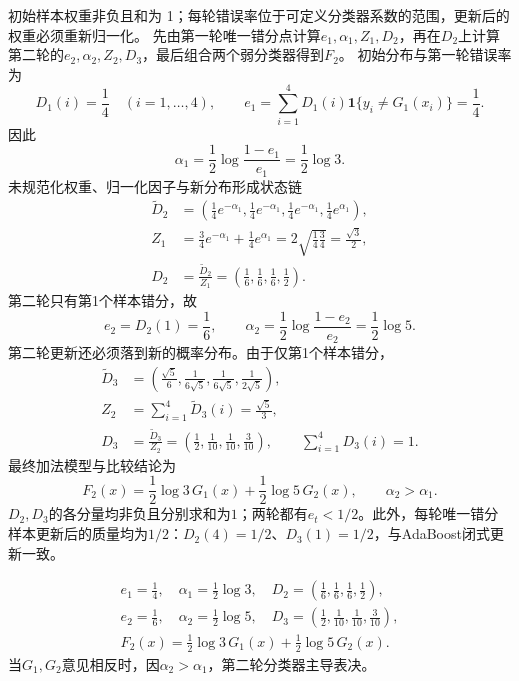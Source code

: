 \begin{solution}
\SolGiven 初始样本权重非负且和为 1；每轮错误率位于可定义分类器系数的范围，更新后的权重必须重新归一化。
\SolPlan 先由第一轮唯一错分点计算$e_1,\alpha_1,Z_1,D_2$，再在$D_2$上计算第二轮的$e_2,\alpha_2,Z_2,D_3$，最后组合两个弱分类器得到$F_2$。
\SolDerive
初始分布与第一轮错误率为
\[
D_1(i)=\frac14\quad(i=1,\ldots,4),
\qquad
e_1=\sum_{i=1}^{4}D_1(i)\mathbf1\{y_i\neq G_1(x_i)\}=\frac14.
\]
因此
\[
\alpha_1
=\frac12\log\frac{1-e_1}{e_1}
=\frac12\log3.
\]
未规范化权重、归一化因子与新分布形成状态链
\[
\begin{aligned}
\widetilde D_2
&=\left(\frac14e^{-\alpha_1},\frac14e^{-\alpha_1},
\frac14e^{-\alpha_1},\frac14e^{\alpha_1}\right),\\
Z_1
&=\frac34e^{-\alpha_1}+\frac14e^{\alpha_1}
=2\sqrt{\frac14\frac34}=\frac{\sqrt3}{2},\\
D_2&=\frac{\widetilde D_2}{Z_1}
=\left(\frac16,\frac16,\frac16,\frac12\right).
\end{aligned}
\]
第二轮只有第1个样本错分，故
\[
e_2=D_2(1)=\frac16,
\qquad
\alpha_2=\frac12\log\frac{1-e_2}{e_2}
=\frac12\log5.
\]
第二轮更新还必须落到新的概率分布。由于仅第1个样本错分，
\[
\begin{aligned}
\widetilde D_3
&=\left(\frac{\sqrt5}{6},
\frac{1}{6\sqrt5},
\frac{1}{6\sqrt5},
\frac{1}{2\sqrt5}\right),\\
Z_2&=\sum_{i=1}^{4}\widetilde D_3(i)
=\frac{\sqrt5}{3},\\
D_3&=\frac{\widetilde D_3}{Z_2}
=\left(\frac12,\frac1{10},\frac1{10},\frac3{10}\right),
\qquad \sum_{i=1}^{4}D_3(i)=1.
\end{aligned}
\]
最终加法模型与比较结论为
\[
F_2(x)=\frac12\log3\,G_1(x)+\frac12\log5\,G_2(x),
\qquad
\alpha_2>\alpha_1.
\]
\SolCheck $D_2,D_3$的各分量均非负且分别求和为$1$；两轮都有$e_t<1/2$。此外，每轮唯一错分样本更新后的质量均为$1/2$：$D_2(4)=1/2$、$D_3(1)=1/2$，与AdaBoost闭式更新一致。

\SolAnswer
\[
\begin{gathered}
e_1=\frac14,\quad \alpha_1=\frac12\log3,\quad
D_2=\left(\frac16,\frac16,\frac16,\frac12\right),\\
e_2=\frac16,\quad \alpha_2=\frac12\log5,\quad
D_3=\left(\frac12,\frac1{10},\frac1{10},\frac3{10}\right),\\
F_2(x)=\frac12\log3\,G_1(x)+\frac12\log5\,G_2(x).
\end{gathered}
\]
当$G_1,G_2$意见相反时，因$\alpha_2>\alpha_1$，第二轮分类器主导表决。
\end{solution}

